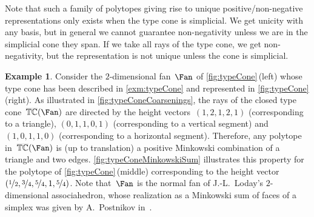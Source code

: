 \documentclass{amsart}
\theoremstyle{definition}
\newtheorem{example}[theorem]{Example}
\newcommand{\ctypeCone}{\smash{\overline{\mathbb{TC}}}} %
\begin{document}
Note that such a family of polytopes giving rise to unique positive/non-negative representations only exists when the type cone is simplicial. We get unicity with any basis, but in general we cannot guarantee non-negativity unless we are in the simplicial cone they span. If we take all rays of the type cone, we get non-negativity, but the representation is not unique unless the cone is simplicial.

\begin{example}
\label{exm:typeConeMinkowskiSum}
Consider the $2$-dimensional fan~$\Fan$ of \cref{fig:typeCone}\,(left) whose type cone has been described in \cref{exm:typeCone} and represented in \cref{fig:typeCone}\,(right).
As illustrated in \cref{fig:typeConeCoarsenings}, the rays of the closed type cone~$\ctypeCone(\Fan)$ are directed by the height vectors~$(1,2,1,2,1)$ (corresponding to a triangle), $(0,1,1,0,1)$ (corresponding to a vertical segment) and~$(1,0,1,1,0)$ (corresponding to a horizontal segment).
Therefore, any polytope in~$\ctypeCone(\Fan)$ is (up to translation) a positive Minkowski combination of a triangle and two edges.
\cref{fig:typeConeMinkowskiSum} illustrates this property for the polytope of \cref{fig:typeCone}\,(middle) corresponding to the height vector~$(\nicefrac{1}{2}, \nicefrac{3}{4}, \nicefrac{5}{4}, 1, \nicefrac{5}{4})$.
Note that~$\Fan$ is the normal fan of J.-L.~Loday's $2$-dimensional associahedron, whose realization as a Minkowski sum of faces of a simplex was given by A.~Postnikov in~\cite{Postnikov}.


\end{example}
\end{document}
